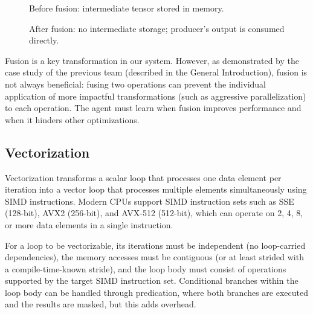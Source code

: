 \begin{figure}[H]
    \centering
    \caption{Before fusion: intermediate tensor stored in memory.}
    \label{fig:fusion-before}
\end{figure}

\begin{figure}[H]
    \centering
    \caption{After fusion: no intermediate storage; producer's output is consumed directly.}
    \label{fig:fusion-after}
\end{figure}

Fusion is a key transformation in our system. However, as demonstrated by the case study of the previous team (described in the General Introduction), fusion is not always beneficial: fusing two operations can prevent the individual application of more impactful transformations (such as aggressive parallelization) to each operation. The agent must learn when fusion improves performance and when it hinders other optimizations.

\subsection{Vectorization}

Vectorization transforms a scalar loop that processes one data element per iteration into a vector loop that processes multiple elements simultaneously using SIMD instructions. Modern CPUs support SIMD instruction sets such as SSE (128-bit), AVX2 (256-bit), and AVX-512 (512-bit), which can operate on 2, 4, 8, or more data elements in a single instruction.

For a loop to be vectorizable, its iterations must be independent (no loop-carried dependencies), the memory accesses must be contiguous (or at least strided with a compile-time-known stride), and the loop body must consist of operations supported by the target SIMD instruction set. Conditional branches within the loop body can be handled through predication, where both branches are executed and the results are masked, but this adds overhead.

